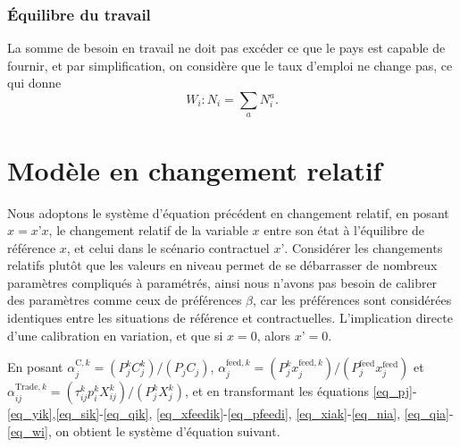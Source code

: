 \subsubsection{Équilibre du travail}
La somme de besoin en travail ne doit pas excéder ce que le pays est capable de fournir, et par simplification, on considère que le taux d’emploi ne change pas, ce qui donne
\begin{equation}\label{eq_wi}
    W_i: N_i=\sum_a N_i^a.
\end{equation}

\section{Modèle en changement relatif}

Nous adoptons le système d’équation précédent en changement relatif, en posant $\hat{x} = x’ x$, le changement relatif de la variable $x$ entre son état à l’équilibre de référence $x$, et celui dans le scénario contractuel $x’$. Considérer les changements relatifs plutôt que les valeurs en niveau permet de se débarrasser de nombreux paramètres compliqués à paramétrés, ainsi nous n’avons pas besoin de calibrer des paramètres comme ceux de préférences $\beta$, car les préférences sont considérées identiques entre les situations de référence et contractuelles. L’implication directe d’une calibration en variation, et que si $x = 0$, alors $x’ = 0$.

En posant $\alpha_j^{\text{C},k} = {(P_j^k C_j^k)}/{(P_j C_j)}$, $\alpha^{\text{feed},k}_j = {(P_j^k x^{\text{feed},k}_j)} /{(P^\text{feed}_j x^\text{feed}_j)}$ et $\alpha^{\text{Trade},k}_{ij} = (\tau_{ij}^k p_i^k X_{ij}^k)/(P_j^kX_{j}^k)$, et en transformant les équations \ref{eq_pj}-\ref{eq_yik},\ref{eq_sik}-\ref{eq_qik}, \ref{eq_xfeedik}-\ref{eq_pfeedi}, \ref{eq_xiak}-\ref{eq_nia}, \ref{eq_qia}-\ref{eq_wi}, on obtient le système d’équation suivant.


